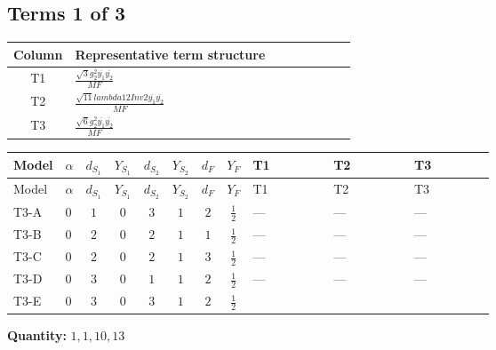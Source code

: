 \documentclass[8pt]{article}
\begin{document}
\begin{landscape}
\subsection*{Terms 1 of 3}
\begin{center}
\begin{tabular}{@{}c >{\raggedright\arraybackslash}p{0.82\linewidth}@{}}
\toprule
Column & Representative term structure \\
\midrule
T1 & \(\displaystyle \frac{\sqrt{3} g_{2}^{2} \overline{y_{1}} \overline{y_{2}}}{MF}\) \\
\midrule
T2 & \(\displaystyle \frac{\sqrt{11} lambda12Inv2 \overline{y_{1}} \overline{y_{2}}}{MF}\) \\
\midrule
T3 & \(\displaystyle \frac{\sqrt{6} g_{2}^{2} \overline{y_{1}} \overline{y_{2}}}{MF}\) \\
\midrule
\bottomrule
\end{tabular}
\end{center}
\smallskip
\tiny
\begin{longtable}{@{}llcccccc >{\raggedright\arraybackslash}p{0.21\linewidth} >{\raggedright\arraybackslash}p{0.21\linewidth} >{\raggedright\arraybackslash}p{0.21\linewidth}@{}}
\toprule
Model & $\alpha$ & $d_{S_1}$ & $Y_{S_1}$ & $d_{S_2}$ & $Y_{S_2}$ & $d_F$ & $Y_F$ & T1 & T2 & T3 \\
\midrule
\endfirsthead
\toprule
Model & $\alpha$ & $d_{S_1}$ & $Y_{S_1}$ & $d_{S_2}$ & $Y_{S_2}$ & $d_F$ & $Y_F$ & T1 & T2 & T3 \\
\midrule
\endhead
T3-A & $0$ & $1$ & $0$ & $3$ & $1$ & $2$ & $\frac{1}{2}$ & --- & --- & --- \\
\midrule
T3-B & $0$ & $2$ & $0$ & $2$ & $1$ & $1$ & $\frac{1}{2}$ & --- & --- & --- \\
\midrule
T3-C & $0$ & $2$ & $0$ & $2$ & $1$ & $3$ & $\frac{1}{2}$ & --- & --- & --- \\
\midrule
T3-D & $0$ & $3$ & $0$ & $1$ & $1$ & $2$ & $\frac{1}{2}$ & --- & --- & --- \\
\midrule
T3-E & $0$ & $3$ & $0$ & $3$ & $1$ & $2$ & $\frac{1}{2}$ & \scriptsize\adjustbox{max width=\linewidth}{$\begin{gathered} - \frac{49 \sqrt{3} g_{2}^{2} \overline{y_{1}} \overline{y_{2}}}{24 MF}\end{gathered}$} & \scriptsize\adjustbox{max width=\linewidth}{$\begin{gathered} - \frac{3 \sqrt{11} lambda12Inv2 \overline{y_{1}} \overline{y_{2}}}{22 MF}\end{gathered}$} & \scriptsize\adjustbox{max width=\linewidth}{$\begin{gathered} - \frac{\sqrt{6} g_{2}^{2} \overline{y_{1}} \overline{y_{2}}}{3 MF}\end{gathered}$} \\
\midrule
\bottomrule
\end{longtable}
\clearpage
\noindent\textbf{Quantity: }$\mathrm{1,1,10,13}$\par\smallskip

\end{landscape}
\end{document}
